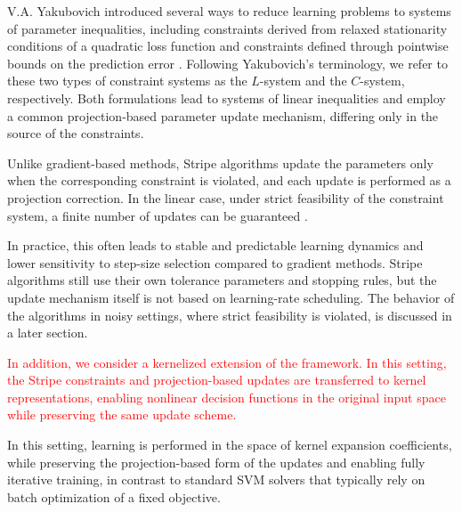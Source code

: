 \documentclass[a4paper,fleqn]{cas-sc}
\begin{document}

V.A. Yakubovich introduced several ways to reduce learning problems to systems of parameter inequalities, including constraints derived from relaxed stationarity conditions of a quadratic loss function and constraints defined through pointwise bounds on the prediction error \cite{Yakubovich1966Recurrent}. Following Yakubovich’s terminology, we refer to these two types of constraint systems as the $L$-system and the $C$-system, respectively. Both formulations lead to systems of linear inequalities and employ a common projection-based parameter update mechanism, differing only in the source of the constraints. 

Unlike gradient-based methods, Stripe algorithms update the parameters only when the corresponding constraint is violated, and each update is performed as a projection correction. In the linear case, under strict feasibility of the constraint system, a finite number of updates can be guaranteed \cite{Yakubovich1966Recurrent}.

In practice, this often leads to stable and predictable learning dynamics and lower sensitivity to step-size selection compared to gradient methods. Stripe algorithms still use their own tolerance parameters and stopping rules, but the update mechanism itself is not based on learning-rate scheduling. The behavior of the algorithms in noisy settings, where strict feasibility is violated, is discussed in a later section.

\textcolor{red}{In addition, we consider a kernelized extension of the framework. In this setting, the Stripe constraints and projection-based updates are transferred to kernel representations, enabling nonlinear decision functions in the original input space while preserving the same update scheme.}


In this setting, learning is performed in the space of kernel expansion coefficients, while preserving the projection-based form of the updates and enabling fully iterative training, in contrast to standard SVM solvers that typically rely on batch optimization of a fixed objective.
\end{document}
